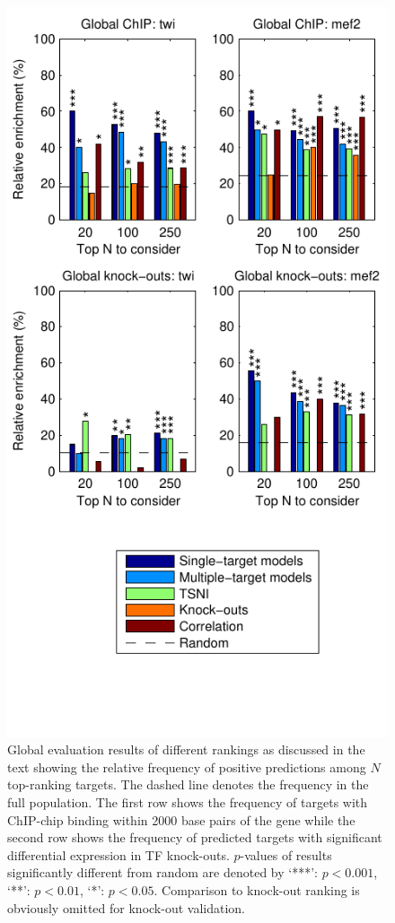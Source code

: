 \documentclass{article}
\begin{document}
\begin{figure}[tb]
  \centering
  \includegraphics[trim=0mm 18mm 0mm 0mm]{dros_global_evaluation_supplement}
  \caption{Global evaluation results of different rankings as
    discussed in the text showing the relative frequency of positive
    predictions among $N$ top-ranking targets.
    The dashed line
    denotes the frequency in the full population.
    The first row shows the frequency of targets with ChIP-chip
    binding within 2000 base pairs of the gene
    while the second row shows the frequency of
    predicted targets with significant differential
    expression in TF knock-outs.
    $p$-values of results significantly different from random are
    denoted by `***': $p <
    0.001$, `**': $p < 0.01$, `*': $p < 0.05$.
    Comparison to knock-out ranking is obviously omitted for knock-out
    validation. \label{fig:dros_global_evaluation}
  }
\end{figure}
\end{document}
